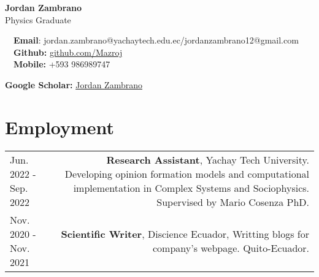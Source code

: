 \documentclass{article}
\begin{document}
\small %

\begin{center}
\huge
\textbf{Jordan Zambrano} \\
\normalsize
Physics Graduate \\
\end{center}

\begin{minipage}[ht]{0.6\linewidth}
	\faEnvelope~~\textbf{Email}: jordan.zambrano@yachaytech.edu.ec/jordanzambrano12@gmail.com \\
	\faGithub~~\textbf{Github:} \href{https://github.com/Mazroj}{github.com/Mazroj}\\
  \faPhone~~\textbf{Mobile:} +593 986989747 \\
\end{minipage}
\begin{minipage}[ht]{0.34\linewidth}
	\begin{flushright}
    \textbf{Google Scholar:} \href{https://scholar.google.com/citations?user=XTLj31oAAAAJ&hl=es}{Jordan Zambrano} \\
	\end{flushright}
\end{minipage}

\section*{Employment}

\begin{tabular}{L!{\vrule}R}
    
    Jun. 2022 - Sep. 2022 & \textbf{Research Assistant}, Yachay Tech University. Developing opinion formation models and computational implementation in Complex Systems and Sociophysics. Supervised by Mario Cosenza PhD.\\
    Nov. 2020 - Nov. 2021 & \textbf{Scientific Writer}, Discience Ecuador, Writting blogs for company's webpage. Quito-Ecuador. \\
\end{tabular}
\end{document}
